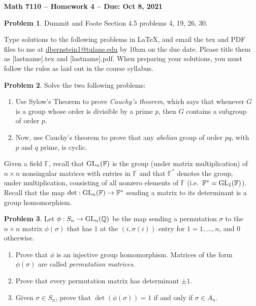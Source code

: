 \documentclass[letterpaper,11pt]{amsart}
\theoremstyle{plain}
\theoremstyle{definition}
\newtheorem{pr}{Problem}
\theoremstyle{remark}
\begin{document}
\Large

\begin{center}
{\bf Math 7110 -- Homework  4 --  Due:  Oct 8, 2021}
\end{center}

\normalsize


\medskip


\begin{pr}
    Dummit and Foote Section 4.5 problems 4, 19, 26, 30.
\end{pr}

\bigskip

Type solutions to the following problems in \LaTeX, and email the tex and PDF files to me at \url{dbernstein1@tulane.edu} by 10am on the due date.
Please title them as [lastname].tex and [lastname].pdf.
When preparing your solutions, you must follow the rules as laid out in the course syllabus.

\vspace{.5cm}


\begin{pr}
    Solve the two following problems:
    \begin{enumerate}
        \item Use Sylow's Theorem to prove \emph{Cauchy's theorem}, which says that whenever $G$ is a group whose order is divisible by a prime $p$, then $G$ contains a subgroup of order $p$.
        \item Now, use Cauchy's theorem to prove that any \emph{abelian} group of order $pq$, with $p$ and $q$ prime, is cyclic.
    \end{enumerate}
\end{pr}

Given a field $\mathbb{F}$, recall that ${\rm GL}_n(\mathbb{F})$ is the group (under matrix multiplication) of $n\times n$ nonsingular matrices with entries in $\mathbb{F}$ and that $\mathbb{F}^{*}$ denotes the group, under multiplication, consisting of all nonzero elements of $\mathbb{F}$ (i.e.~$\mathbb{F}^{*} = {\rm GL}_1(\mathbb{F})$).
Recall that the map $\det: {\rm GL}_n(\mathbb{F}) \rightarrow \mathbb{F}^*$ sending a matrix to its determinant is a group homomorphism.

\begin{pr}
    Let $\phi: S_n \rightarrow {\rm GL}_n(\mathbb{Q})$ be the map sending a permutation $\sigma$ to the $n\times n$ matrix $\phi(\sigma)$ that has $1$ at the $(i,\sigma(i))$ entry for $1 = 1,\dots,n$, and $0$ otherwise.
    \begin{enumerate}
        \item Prove that $\phi$ is an injective group homomorphism. Matrices of the form $\phi(\sigma)$ are called \emph{permutation matrices}.
        \item Prove that every permutation matrix has determinant $\pm 1$.
        \item Given $\sigma \in S_n$, prove that $\det(\phi(\sigma)) = 1$ if and only if $\sigma \in A_n$.
    \end{enumerate}
\end{pr}
\end{document}
